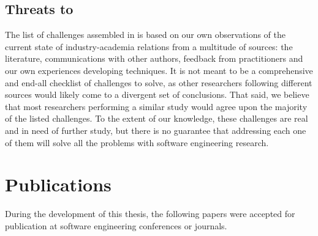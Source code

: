 \subsection{Threats to  }

The list of challenges assembled in  is based on our own observations of the current state of industry-academia relations from a multitude of sources: the literature, communications with other authors, feedback from practitioners and our own experiences developing techniques.
It is not meant to be a comprehensive and end-all checklist of challenges to solve, as other researchers following different sources would likely come to a divergent set of conclusions.
That said, we believe that most researchers performing a similar study would agree upon the majority of the listed challenges.
To the extent of our knowledge, these challenges are real and in need of further study, but there is no guarantee that addressing each one of them will solve all the problems with software engineering research.

\section{Publications}\label{sec:publications}

During the development of this thesis, the following papers were accepted for publication at software engineering conferences or journals.


\begin{refsection}[P]
	\newrefcontext[labelprefix=P]
	\nocite{*}
    \printbibliography[heading=P]
\end{refsection}





%

